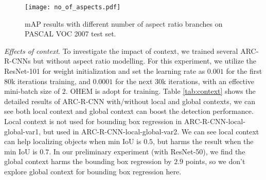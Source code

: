 \documentclass[10pt,twocolumn,letterpaper]{article}
\begin{document}
\begin{figure}
\centering
{\texttt{[image: no\_of\_aspects.pdf]}}
\caption{mAP results with different number of aspect ratio branches on PASCAL VOC 2007 test set. \vspace{-3mm} }
\label{fig:aspects}
\end{figure} 

\textit{Effects of context}.
To investigate the impact of context, we trained several ARC-R-CNNs but without aspect ratio modelling.
For this experiment, we utilize the ResNet-101 for weight initialization and set the learning rate as $0.001$ for the first $80$k iterations training, and $0.0001$ for the next $30$k iterations, with an effective mini-batch size of $2$. OHEM is adopt for training. 
Table \ref{tab:context} shows the detailed results of ARC-R-CNN with/without local and global contexts, we can see both local context and global context can boost the detection performance. Local context is not used for bounding box regression in ARC-R-CNN-local-global-var1, but used in ARC-R-CNN-local-global-var2.
We can see local context can help localizing objects when min IoU is $0.5$, but harms the result when the min IoU is $0.7$.
In our preliminary experiment (with ResNet-50), we find the global context harms the bounding box regression by $2.9$ points, so we don't  explore global context for bounding box regression here.

\begin{table} 
\begin{center}
\end{center}
\caption{mAP results with local and global context on PASCAL VOC 2007 test set. Local context is not used for bounding box regression in ARC-R-CNN-Res101-local-global-context$^1$, but used in ARC-R-CNN-Res101-local-global-context$^2$.}
\label{tab:context} 
\vspace{-2mm}
\end{table}
\end{document}
